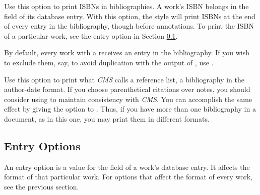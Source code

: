 \documentclass[11pt,letterpaper,oneside]{article}
\begin{document}
\begin{optionlist}

Use this option to print ISBNs in bibliographies. A work's ISBN
belongs in the  field of its database entry. With this
option, the style will print ISBNs at the end of every entry in the
bibliography, though before annotations. To print the ISBN of a
particular work, see the  entry option in Section
\ref{entryops}.


By default, every work with a  receives an entry
in the bibliography. If you wish to exclude them, say, to avoid
duplication with the output of , use .


Use this option to print what \textit{CMS} calls a reference list, a
bibliography in the author-date format. If you choose parenthetical
citations over notes, you should consider using  to
maintain consistency with \textit{CMS}. You can accomplish the same
effect by giving the option  to
. Thus, if you have more than one bibliography
in a document, as in this one, you may print them in different
formats.

\end{optionlist}

\subsection{Entry Options}
\label{entryops}

An entry option is a value for the  field of a
work's database entry. It affects the format of that particular work.
For options that affect the format of every work, see the previous
section.
\end{document}
